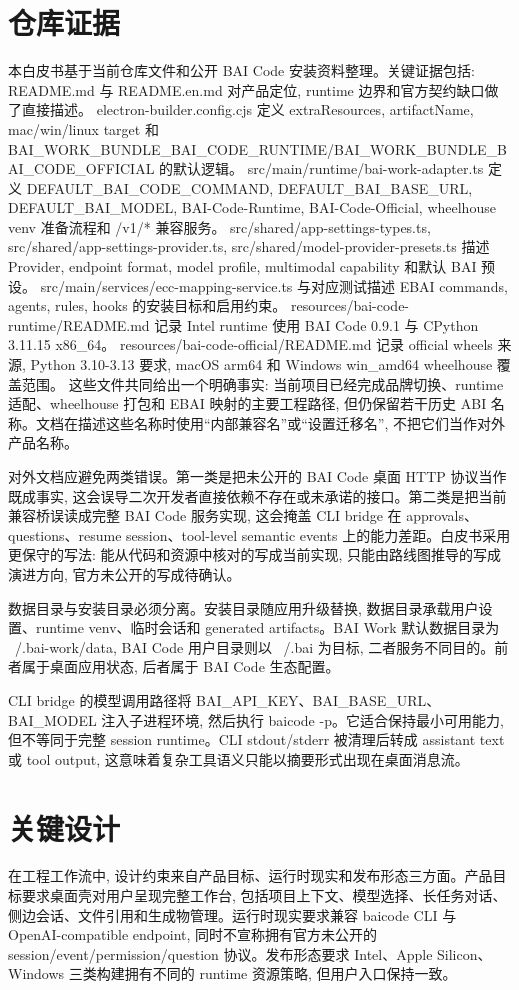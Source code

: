 \section{仓库证据}
本白皮书基于当前仓库文件和公开 BAI Code 安装资料整理。关键证据包括: README.md 与 README.en.md 对产品定位, runtime 边界和官方契约缺口做了直接描述。 electron-builder.config.cjs 定义 extraResources, artifactName, mac/win/linux target 和 BAI\_WORK\_BUNDLE\_BAI\_CODE\_RUNTIME/BAI\_WORK\_BUNDLE\_BAI\_CODE\_OFFICIAL 的默认逻辑。 src/main/runtime/bai-work-adapter.ts 定义 DEFAULT\_BAI\_CODE\_COMMAND, DEFAULT\_BAI\_BASE\_URL, DEFAULT\_BAI\_MODEL, BAI-Code-Runtime, BAI-Code-Official, wheelhouse venv 准备流程和 /v1/* 兼容服务。 src/shared/app-settings-types.ts, src/shared/app-settings-provider.ts, src/shared/model-provider-presets.ts 描述 Provider, endpoint format, model profile, multimodal capability 和默认 BAI 预设。 src/main/services/ecc-mapping-service.ts 与对应测试描述 EBAI commands, agents, rules, hooks 的安装目标和启用约束。 resources/bai-code-runtime/README.md 记录 Intel runtime 使用 BAI Code 0.9.1 与 CPython 3.11.15 x86\_64。 resources/bai-code-official/README.md 记录 official wheels 来源, Python 3.10-3.13 要求, macOS arm64 和 Windows win\_amd64 wheelhouse 覆盖范围。 这些文件共同给出一个明确事实: 当前项目已经完成品牌切换、runtime 适配、wheelhouse 打包和 EBAI 映射的主要工程路径, 但仍保留若干历史 ABI 名称。文档在描述这些名称时使用“内部兼容名”或“设置迁移名”, 不把它们当作对外产品名称。

对外文档应避免两类错误。第一类是把未公开的 BAI Code 桌面 HTTP 协议当作既成事实, 这会误导二次开发者直接依赖不存在或未承诺的接口。第二类是把当前兼容桥误读成完整 BAI Code 服务实现, 这会掩盖 CLI bridge 在 approvals、questions、resume session、tool-level semantic events 上的能力差距。白皮书采用更保守的写法: 能从代码和资源中核对的写成当前实现, 只能由路线图推导的写成演进方向, 官方未公开的写成待确认。

数据目录与安装目录必须分离。安装目录随应用升级替换, 数据目录承载用户设置、runtime venv、临时会话和 generated artifacts。BAI Work 默认数据目录为 ~/.bai-work/data, BAI Code 用户目录则以 ~/.bai 为目标, 二者服务不同目的。前者属于桌面应用状态, 后者属于 BAI Code 生态配置。

CLI bridge 的模型调用路径将 BAI\_API\_KEY、BAI\_BASE\_URL、BAI\_MODEL 注入子进程环境, 然后执行 baicode -p。它适合保持最小可用能力, 但不等同于完整 session runtime。CLI stdout/stderr 被清理后转成 assistant text 或 tool output, 这意味着复杂工具语义只能以摘要形式出现在桌面消息流。

\section{关键设计}
在工程工作流中, 设计约束来自产品目标、运行时现实和发布形态三方面。产品目标要求桌面壳对用户呈现完整工作台, 包括项目上下文、模型选择、长任务对话、侧边会话、文件引用和生成物管理。运行时现实要求兼容 baicode CLI 与 OpenAI-compatible endpoint, 同时不宣称拥有官方未公开的 session/event/permission/question 协议。发布形态要求 Intel、Apple Silicon、Windows 三类构建拥有不同的 runtime 资源策略, 但用户入口保持一致。

